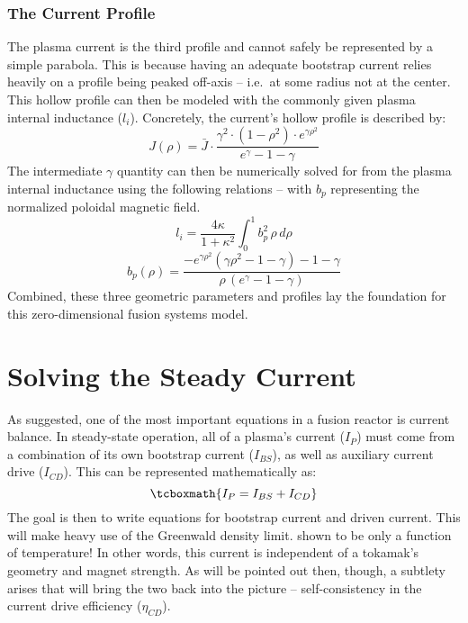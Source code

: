 \subsubsection{The Current  Profile}

The plasma current  is the third profile and cannot safely be represented by a simple parabola. This is because having an adequate bootstrap current relies heavily on a profile being peaked off-axis -- i.e.\ at some radius not at the center. This hollow profile can then be modeled with the commonly given plasma internal inductance ($l_i$). Concretely, the current's hollow profile is described by:
\begin{equation}
	J(\rho) = \bar{J} \cdot \frac{ \gamma ^ 2 \cdot ( 1 - \rho ^ 2 ) \cdot e^{ \gamma \rho^2 } }{ e^\gamma - 1 - \gamma}
\end{equation}
The intermediate $\gamma$ quantity can then be numerically solved for from the plasma internal inductance using the following relations -- with $b_p$ representing the normalized poloidal magnetic field. 
\begin{equation}
	l_i = \frac{4 \kappa}{1+\kappa^2}	 \int_0^1 b_p^2 \, \rho \, d\rho
\end{equation}
\begin{equation}
	\label{eq:b_p}
	b_p(\rho) = \frac{ -e^{\gamma\rho^2} ( \gamma\rho^2 - 1 - \gamma ) - 1 - \gamma }{\rho \,( e^\gamma - 1 - \gamma ) }
\end{equation}
Combined, these three geometric parameters and profiles lay the foundation for this zero-dimensional fusion systems model.

\section{Solving the Steady Current}

As suggested, one of the most important equations in a fusion reactor is current balance. In steady-state operation, all of a plasma's current ($I_P$) must come from a combination of its own bootstrap current ($I_{BS}$), as well as auxiliary current drive ($I_{CD}$). This can be represented mathematically as:
\begin{equation}
	\label{eq:ibal}
	\tcboxmath{
	I_P = I_{BS} + I_{CD}
	}
\end{equation}
The goal is then to write equations for bootstrap current and driven current. This will make heavy use of the Greenwald density limit.  shown to be only a function of temperature! In other words, this current is independent of a tokamak's geometry and magnet strength. As will be pointed out then, though, a subtlety arises that will bring the two back into the picture -- self-consistency in the current drive efficiency ($\eta_{CD}$).

